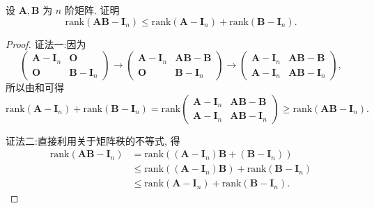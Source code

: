 \documentclass[../../main.tex]{subfiles}%
\begin{document}
\begin{proposition}\label{proposition:矩阵与单位阵差相关不等式}
设 $\boldsymbol{A},\boldsymbol{B}$ 为 $n$ 阶矩阵. 证明
\[
\mathrm{rank}(\boldsymbol{AB} - \boldsymbol{I}_n) \leqslant \mathrm{rank}(\boldsymbol{A} - \boldsymbol{I}_n) + \mathrm{rank}(\boldsymbol{B} - \boldsymbol{I}_n).
\]
\end{proposition}
\begin{proof}

{\color{blue}证法一:}因为
\[
\begin{pmatrix} 
\boldsymbol{A} - \boldsymbol{I}_n & \boldsymbol{O} \\
\boldsymbol{O} & \boldsymbol{B} - \boldsymbol{I}_n 
\end{pmatrix} \to \begin{pmatrix} 
\boldsymbol{A} - \boldsymbol{I}_n & \boldsymbol{AB} - \boldsymbol{B} \\
\boldsymbol{O} & \boldsymbol{B} - \boldsymbol{I}_n 
\end{pmatrix} \to \begin{pmatrix} 
\boldsymbol{A} - \boldsymbol{I}_n & \boldsymbol{AB} - \boldsymbol{B} \\
\boldsymbol{A} - \boldsymbol{I}_n & \boldsymbol{AB} - \boldsymbol{I}_n 
\end{pmatrix},
\]
所以由和可得
\[
\mathrm{rank}(\boldsymbol{A} - \boldsymbol{I}_n) + \mathrm{rank}(\boldsymbol{B} - \boldsymbol{I}_n) = \mathrm{rank}\begin{pmatrix} 
\boldsymbol{A} - \boldsymbol{I}_n & \boldsymbol{AB} - \boldsymbol{B} \\
\boldsymbol{A} - \boldsymbol{I}_n & \boldsymbol{AB} - \boldsymbol{I}_n 
\end{pmatrix} \geqslant \mathrm{rank}(\boldsymbol{AB} - \boldsymbol{I}_n).
\]

{\color{blue}证法二:}直接利用关于矩阵秩的不等式, 得
\begin{align*}
\mathrm{rank}(\boldsymbol{AB} - \boldsymbol{I}_n) &= \mathrm{rank}((\boldsymbol{A} - \boldsymbol{I}_n)\boldsymbol{B} + (\boldsymbol{B} - \boldsymbol{I}_n)) \\
&\leqslant \mathrm{rank}((\boldsymbol{A} - \boldsymbol{I}_n)\boldsymbol{B}) + \mathrm{rank}(\boldsymbol{B} - \boldsymbol{I}_n) \\
&\leqslant \mathrm{rank}(\boldsymbol{A} - \boldsymbol{I}_n) + \mathrm{rank}(\boldsymbol{B} - \boldsymbol{I}_n).
\end{align*}

\end{proof}
\end{document}
